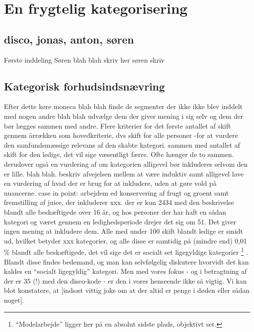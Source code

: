 
\section{En frygtelig kategorisering \label{discokategorisering}}

\subsection{disco, jonas, anton, søren}

Første inddeling Søren blah blah skriv her søren skriv 

\subsection{Kategorisk forhudsindsnævring}

Efter dette køre moneca blah blah finde de segmenter der ikke ikke blev inddelt med nogen andre blah blah udvælge dem der giver mening i sig selv og dem der bør lægges sammen med andre. Flere kriterier for det første antallet af skift gennem årrækken som hovedkriterie, dvs skift for alle personer -for at vurdere den samfundsmæssige relevans af den skabte kategori. sammen med antallet af skift for den ledige, det vil sige væsentligt færre. Ofte hænger de to sammen. derudover også en vurdering af om kategorien alligevel bør inkluderes selvom den er lille. blah blah. beskriv afvejelsen mellem at være induktiv samt alligevel lave en vurdering af hvad der er brug for at inkludere, uden at gøre vold på nuancerne. case in point: arbejdem ed konservering af frugt og groent samt fremstilling af juice, der inkluderer xxx. %
der er kun 2434 med den beskrivelse blandt alle beskæftigede over 16 år, og hos personer der har haft en sådan kategori og været gennem en ledighedsperiode drejer det sig om 51. Det giver ingen mening at inkludere dem. Alle med under 100 skift blandt ledige er smidt ud, hvilket betyder xxx kategorier, og alle disse er samtidig på (mindre end) 0,01 \% blandt alle beskæftigede, det vil sige det er socialt set ligegyldige kategorier%
%
\footnote{“Modelarbejde” ligger her på en absolut sidste plads, objektivt set.}%
%
. Blandt disse findes bedemand, og man kan selvfølgelig diskutere hvorvidt det kan kaldes en “socialt ligegyldig” kategori. Men med vores fokus - og i betragtning af der er 35 (!) med den disco-kode - er den i vores henseende ikke så vigtig. Vi kan blot konstatere, at [indsæt vittig joke om at der altid er penge i døden eller sådan noget]. 

